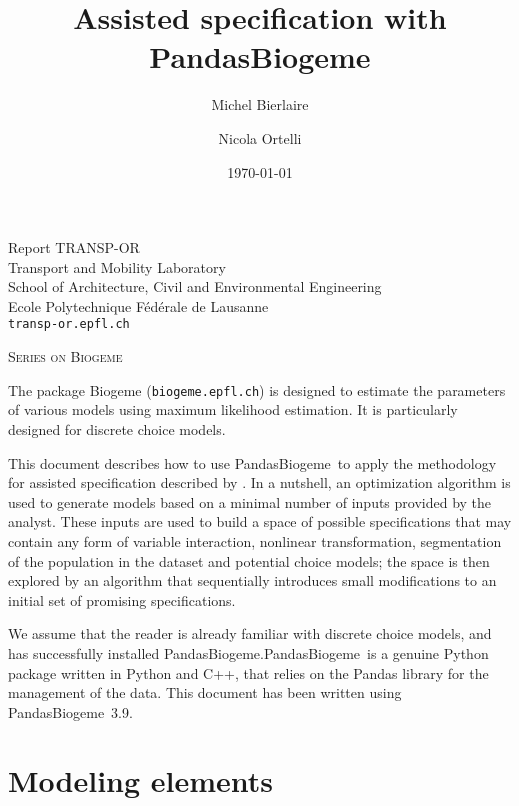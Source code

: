\documentclass[12pt,a4paper]{article}
\title{Assisted specification with PandasBiogeme}
\author{Michel Bierlaire \and Nicola Ortelli}
\date{\today}
\newcommand{\PDBIOGEME}{PandasBiogeme}
\begin{document}
\begin{titlepage}
  \pagestyle{empty}

  \maketitle
  \vspace{2cm}

  \begin{center}
    \small Report TRANSP-OR  \\ Transport and Mobility Laboratory \\ School of Architecture, Civil and Environmental Engineering \\ Ecole Polytechnique F\'ed\'erale de Lausanne \\ \verb+transp-or.epfl.ch+
    \begin{center}
      \textsc{Series on Biogeme}
    \end{center}
  \end{center}


  \clearpage
\end{titlepage}


The package Biogeme (\texttt{biogeme.epfl.ch}) is designed to estimate
the parameters of various models using maximum likelihood
estimation. It is particularly designed for discrete choice
models.

This document describes how to use \PDBIOGEME\ to apply the
methodology for assisted specification described by
. In a nutshell, an optimization
algorithm is used to generate models based on a minimal
number of inputs provided by the analyst. These inputs are used to
build a space of possible specifications that may contain any form of
variable interaction, nonlinear transformation, segmentation of the
population in the dataset and potential choice models; the space is
then explored by an algorithm that sequentially introduces small
modifications to an initial set of promising specifications.

We assume that the reader is already familiar with discrete choice
models, and has successfully installed \PDBIOGEME.\@  \PDBIOGEME\ is
a genuine Python package written in Python and C++, that relies on the
Pandas library for the management of the data.  This document has
been written using \PDBIOGEME\ 3.9.

\clearpage

\section{Modeling elements}
\end{document}
